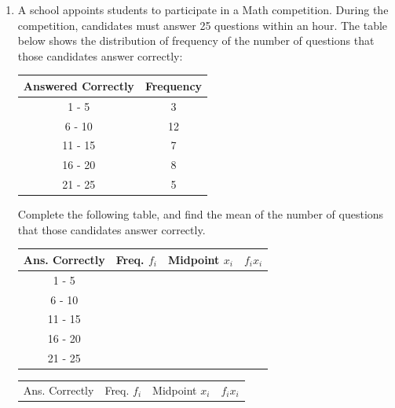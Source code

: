 \documentclass{report}
\begin{document}
\begin{multicols}{2}
\begin{enumerate}
    \item A school appoints students to participate in a Math competition. During the
          competition, candidates must answer 25 questions within an hour. The table
          below shows the distribution of frequency of the number of questions that those
          candidates answer correctly:
          \begin{center}
            \begin{tabular}{|c|c|}
              \hline
              Answered Correctly & Frequency \\
              \hline
              1 - 5              & 3         \\
              6 - 10             & 12        \\
              11 - 15            & 7         \\
              16 - 20            & 8         \\
              21 - 25            & 5         \\
              \hline
            \end{tabular}
          \end{center}
          Complete the following table, and find the mean of the number of questions that those candidates answer correctly.
          \begin{center}
            \begin{tabular}{|c|c|c|c|}
              \hline
              Ans. Correctly & Freq. $f_i$ & Midpoint $x_i$ & $f_ix_i$ \\
              \hline
              1 - 5          &             &                &          \\
              6 - 10         &             &                &          \\
              11 - 15        &             &                &          \\
              16 - 20        &             &                &          \\
              21 - 25        &             &                &          \\
              \hline
            \end{tabular}
          \end{center}
          \sol{}
          \begin{center}
            \begin{tabular}{|c|c|c|c|}
              \hline
              Ans. Correctly & Freq. $f_i$     & Midpoint $x_i$       & $f_ix_i$ \\

\end{tabular}
\end{center}
\end{enumerate}
\end{multicols}
\end{document}
